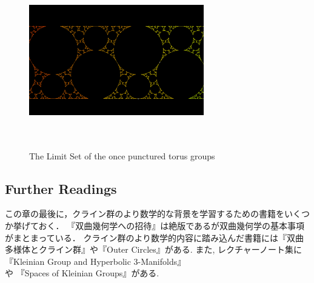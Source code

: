 \begin{figure}[htbp]
 \begin{center}
      \includegraphics[width=3in, height=3in, keepaspectratio]{../img/klein/optg.pdf}
    \caption{The Limit Set of the once punctured torus groups}
    \label{fig:opt}
 \end{center}
\end{figure}

\subsection{Further Readings}
この章の最後に，クライン群のより数学的な背景を学習するための書籍をいくつか挙げておく．
『双曲幾何学への招待』\cite{invitation}は絶版であるが双曲幾何学の基本事項がまとまっている．
クライン群のより数学的内容に踏み込んだ書籍には『双曲多様体とクライン群』\cite{manifold}や『Outer Circles』\cite{outerCircles}がある.
また, レクチャーノート集に『Kleinian Group and Hyperbolic 3-Manifolds』\cite{kleinianGroupsAndHyperbolic3-Manifolds}や
『Spaces of Kleinian Groups』\cite{space}がある.
